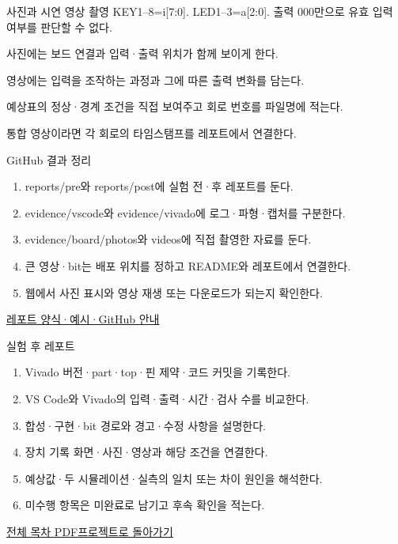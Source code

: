 \begin{frame}{사진과 시연 영상 촬영}\relax
\small
KEY1–8=i[7:0]. LED1–3=a[2:0]. 출력 000만으로 유효 입력 여부를 판단할 수 없다.\par\vspace{0.22cm}사진에는 보드 연결과 입력·출력 위치가 함께 보이게 한다.\par\vspace{0.22cm}영상에는 입력을 조작하는 과정과 그에 따른 출력 변화를 담는다.\par\vspace{0.22cm}예상표의 정상·경계 조건을 직접 보여주고 회로 번호를 파일명에 적는다.\par\vspace{0.22cm}통합 영상이라면 각 회로의 타임스탬프를 레포트에서 연결한다.\par
\end{frame}

\begin{frame}{GitHub 결과 정리}\relax
\small
\begin{enumerate}\setlength{\itemsep}{0.22cm}
\item reports/pre와 reports/post에 실험 전·후 레포트를 둔다.
\item evidence/vscode와 evidence/vivado에 로그·파형·캡처를 구분한다.
\item evidence/board/photos와 videos에 직접 촬영한 자료를 둔다.
\item 큰 영상·bit는 배포 위치를 정하고 README와 레포트에서 연결한다.
\item 웹에서 사진 표시와 영상 재생 또는 다운로드가 되는지 확인한다.
\end{enumerate}
\href{https://github.com/Glaysia/ece2_26_2_2/blob/daily/0910/example/fpga_projects_hdl/LAB1/docs/reports.md}{레포트 양식·예시·GitHub 안내}
\end{frame}

\begin{frame}{실험 후 레포트}\relax
\small
\begin{enumerate}\setlength{\itemsep}{0.22cm}
\item Vivado 버전·part·top·핀 제약·코드 커밋을 기록한다.
\item VS Code와 Vivado의 입력·출력·시간·검사 수를 비교한다.
\item 합성·구현·bit 경로와 경고·수정 사항을 설명한다.
\item 장치 기록 화면·사진·영상과 해당 조건을 연결한다.
\item 예상값·두 시뮬레이션·실측의 일치 또는 차이 원인을 해석한다.
\item 미수행 항목은 미완료로 남기고 후속 확인을 적는다.
\end{enumerate}
\href{04.LAB1_00_CONTENTS.pdf}{전체 목차 PDF}\quad\href{https://github.com/Glaysia/fpga-lab-example-vivado-2026-1-08-encoder8to3/tree/485a6c588c7c9230222c4763deb372f36e5b3384}{프로젝트로 돌아가기}
\end{frame}
\endgroup


